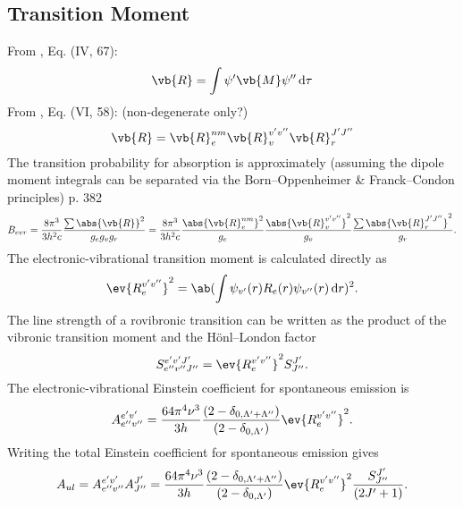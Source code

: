 \documentclass[11pt, twoside, fleqn]{report}
\begin{document}
\subsection{Transition Moment}

From \cite{herzbergMolecularSpectraMolecular1950}, Eq. (IV, 67):
\begin{equation*}
    \vb{R} = \int \psi'\vb{M}\psi'' \odif{\tau}
\end{equation*}
From \cite{herzbergMolecularSpectraMolecular1950}, Eq. (VI, 58): (non-degenerate only?)
\begin{equation*}
    \vb{R} = \vb{R}_e^{nm}\vb{R}_v^{v'v''}\vb{R}_r^{J'J''}
\end{equation*}
The transition probability for absorption is approximately (assuming the dipole moment integrals can be separated via the Born--Oppenheimer \& Franck--Condon principles) \cite{herzbergMolecularSpectraMolecular1950} p. 382
\begin{equation*}
    B_{evr} = \frac{8\pi^3}{3h^2c}\frac{\sum\abs{\vb{R}}^2}{g_eg_vg_r} = \frac{8\pi^3}{3h^2c}\frac{\abs{\vb{R}_e^{nm}}^2}{g_e}\frac{\abs{\vb{R}_v^{v'v''}}^2}{g_v}\frac{\sum\abs{\vb{R}_r^{J'J''}}^2}{g_r}.
\end{equation*}
The electronic-vibrational transition moment is calculated directly as \cite{lauxArraysRadiativeTransition1992}
\begin{equation*}
    \ev{R_e^{v'v''}}^2 = \ab(\int \psi_{v'}(r)R_e(r)\psi_{v''}(r) \odif{r})^2.
\end{equation*}
The line strength of a rovibronic transition can be written as the product of the vibronic transition moment and the H\"onl--London factor \cite{schadeeUniqueDefinitionsBand1978}
\begin{equation*}
    S^{e'v'J'}_{e''v''J''} = \ev{R_e^{v'v''}}^2S^{J'}_{J''}.
\end{equation*}
The electronic-vibrational Einstein coefficient for spontaneous emission is \cite{schadeeUniqueDefinitionsBand1978}
\begin{equation*}
    A^{e'v'}_{e''v''} = \frac{64\pi^4\nu^3}{3h}\frac{(2 - \delta_{0, \Lambda' + \Lambda''})}{(2 - \delta_{0, \Lambda'})}\ev{R_e^{v'v''}}^2.
\end{equation*}
Writing the total Einstein coefficient for spontaneous emission gives
\begin{equation*}
    A_{ul} = A^{e'v'}_{e''v''}A^{J'}_{J''} = \frac{64\pi^4\nu^3}{3h}\frac{(2 - \delta_{0, \Lambda' + \Lambda''})}{(2 - \delta_{0, \Lambda'})}\ev{R_e^{v'v''}}^2\frac{S^{J'}_{J''}}{(2J' + 1)}.
\end{equation*}
\end{document}
